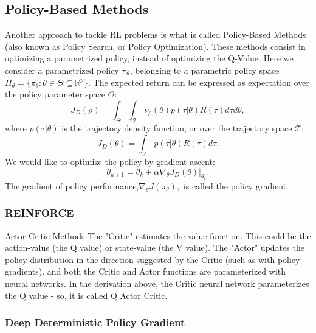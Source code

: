 \subsection{Policy-Based Methods}

Another approach to tackle RL problems is what is called Policy-Based Methods (also known as Policy Search, or Policy Optimization). These methods consist in optimizing a parametrized policy, instead of optimizing the Q-Value. Here we consider a parametrized policy $\pi_\theta$, belonging to a parametric policy space \(\Pi_\theta = \{\pi_\theta:\theta \in \Theta \subseteq \mathbb{R}^p\}\). The expected return can be expressed as expectation over the policy parameter space $\Theta$: \[\] \[ J_D(\rho) = \int_{\Theta} \int_{\mathcal{T}} \nu_\rho(\theta)p(\tau|\theta)R(\tau)d\tau d\theta, \] where $p(\tau|\theta)$ is the trajectory density function, or over the trajectory space $\mathcal{T}$: \[J_D(\theta) = \int_{\mathcal{T}} p(\tau|\theta)R(\tau)d\tau.\]
We would like to optimize the policy by gradient ascent:
\[\theta_{k+1} = \theta_k + \alpha \left. \nabla_{\theta} J_D(\theta) \right|_{\theta_k}.\]
The gradient of policy performance,\(\nabla_{\theta}J(\pi_{\theta}),\) is called the policy gradient.



\subsubsection{REINFORCE}



{Actor-Critic Methods}
The "Critic" estimates the value function. This could be the action-value (the Q value) or state-value (the V value).
The "Actor" updates the policy distribution in the direction suggested by the Critic (such as with policy gradients).
and both the Critic and Actor functions are parameterized with neural networks. In the derivation above, the Critic neural network parameterizes the Q value - so, it is called Q Actor Critic.

\subsubsection{Deep Deterministic Policy Gradient}
\label{ddpg}


